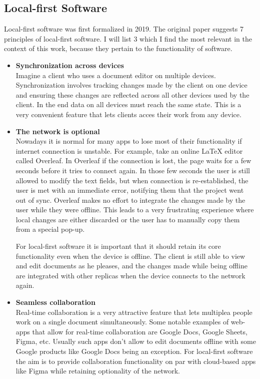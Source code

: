 \documentclass[a4paper, 11pt, oneside]{article}
\theoremstyle{definition}
\begin{document}
\subsection{Local-first Software}
Local-first software was first formalized in 2019. The original paper \cite{localfirst} suggests 7 principles of local-first software. I will list 3 which I find the most relevant in the context of this work, because they pertain to the functionality of software.
\begin{itemize}
    \item \textbf{Synchronization across devices} \\
    Imagine a client who uses a document editor on multiple devices. Synchronization involves tracking changes made by the client on one device and ensuring these changes are reflected across all other devices used by the client. In the end data on all devices must reach the same state. This is a very convenient feature that lets clients acces their work from any device.

    \item \textbf{The network is optional} \\
    Nowadays it is normal for many apps to lose most of their functionality if internet connection is unstable. For example, take an online LaTeX editor called Overleaf. In Overleaf if the connection is lost, the page waits for a few seconds before it tries to connect again. In those few seconds the user is still allowed to modify the text fields, but when connection is re-established, the user is met with an immediate error, notifying them that the project went out of sync. Overleaf makes no effort to integrate the changes made by the user while they were offline. This leads to a very frustrating experience where local changes are either discarded or the user has to manually copy them from a special pop-up.
    
    For local-first software it is important that it should retain its core functionality even when the device is offline. The client is still able to view and edit documents as he pleases, and the changes made while being offline are integrated with other replicas when the device connects to the network again.

    \item \textbf{Seamless collaboration} \\
    Real-time collaboration is a very attractive feature that lets multiplea people work on a single document simultaneously. Some notable examples of web-apps that allow for real-time collaboration are Google Docs, Google Sheets, Figma, etc. Usually such apps don't allow to edit documents offline with some Google products like Google Docs being an exception. For local-first software the aim is to provide collaboration functionality on par with cloud-based apps like Figma while retaining optionality of the network.
\end{itemize}
\end{document}
